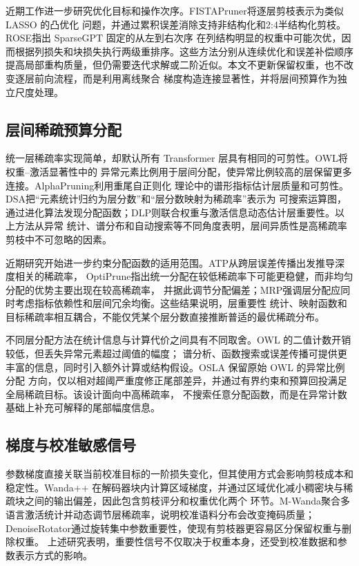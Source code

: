 \documentclass[UTF8,fontset=fandol]{ctexart}
\begin{document}
近期工作进一步研究优化目标和操作次序。FISTAPruner\cite{fistapruner}将逐层剪枝表示为类似 LASSO 的凸优化
问题，并通过累积误差消除支持非结构化和2:4半结构化剪枝。ROSE\cite{rose}指出 SparseGPT 固定的从左到右次序
在列结构明显的权重中可能次优，因而根据列损失和块损失执行两级重排序。这些方法分别从连续优化和误差补偿顺序
提高局部重构质量，但仍需要迭代求解或二阶近似。本文不更新保留权重，也不改变逐层前向流程，而是利用离线聚合
梯度构造连接显著性，并将层间预算作为独立尺度处理。

\subsection{层间稀疏预算分配}

统一层稀疏率实现简单，却默认所有 Transformer 层具有相同的可剪性。OWL\cite{owl}将权重--激活显著性中的
异常元素比例用于层间分配，使异常比例较高的层保留更多连接。AlphaPruning\cite{alphapruning}利用重尾自正则化
理论中的谱形指标估计层质量和可剪性。DSA\cite{dsa}把“元素统计归约为层分数”和“层分数映射为稀疏率”表示为
可搜索运算图，通过进化算法发现分配函数；DLP\cite{dlp}则联合权重与激活信息动态估计层重要性。以上方法从异常
统计、谱分布和自动搜索等不同角度表明，层间异质性是高稀疏率剪枝中不可忽略的因素。

近期研究开始进一步约束分配函数的适用范围。ATP\cite{atp}从跨层误差传播出发推导深度相关的稀疏率，
OptiPrune\cite{optiprune}指出统一分配在较低稀疏率下可能更稳健，而非均匀分配的优势主要出现在较高稀疏率，
并据此调节分配偏差；MRP\cite{mrp}强调层分配应同时考虑指标依赖性和层间冗余均衡。这些结果说明，层重要性
统计、映射函数和目标稀疏率相互耦合，不能仅凭某个层分数直接推断普适的最优稀疏分布。

不同层分配方法在统计信息与计算代价之间具有不同取舍。OWL 的二值计数开销较低，但丢失异常元素超过阈值的幅度；
谱分析、函数搜索或误差传播可提供更丰富的信息，同时引入额外计算或结构假设。OSLA 保留原始 OWL 的异常比例分配
方向，仅以相对超阈严重度修正尾部差异，并通过有界约束和预算回投满足全局稀疏目标。该设计面向中高稀疏率，
不搜索任意分配函数，而是在异常计数基础上补充可解释的尾部幅度信息。

\subsection{梯度与校准敏感信号}

参数梯度直接关联当前校准目标的一阶损失变化，但其使用方式会影响剪枝成本和稳定性。Wanda++\cite{wandaplusplus}
在解码器块内计算区域梯度，并通过区域优化减小稠密块与稀疏块之间的输出偏差，因此包含剪枝评分和权重优化两个
环节。M-Wanda\cite{mwanda}聚合多语言激活统计并动态调节层稀疏率，说明校准语料分布会改变掩码质量；
DenoiseRotator\cite{denoiserotator}通过旋转集中参数重要性，使现有剪枝器更容易区分保留权重与删除权重。
上述研究表明，重要性信号不仅取决于权重本身，还受到校准数据和参数表示方式的影响。
\end{document}

